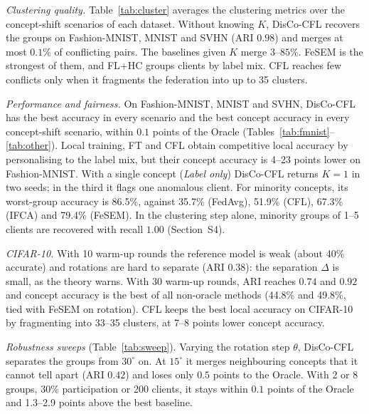 \documentclass[journal]{IEEEtran}
\theoremstyle{definition}
\begin{document}
\emph{Clustering quality.} Table~\ref{tab:cluster} averages the clustering metrics over the concept-shift scenarios of each dataset. Without knowing $K$, DisCo-CFL recovers the groups on Fashion-MNIST, MNIST and SVHN (ARI $0.98$) and merges at most $0.1\%$ of conflicting pairs. The baselines given $K$ merge $3$--$85\%$. FeSEM is the strongest of them, and FL+HC groups clients by label mix. CFL reaches few conflicts only when it fragments the federation into up to 35 clusters.

\begin{table}[t]
\centering
\caption{Clustering: mean ARI and conflict-merge rate (Conf., \%) over the concept-shift scenarios of each dataset.}\label{tab:cluster}
\scriptsize\setlength{\tabcolsep}{2.5pt}

\end{table}

\emph{Performance and fairness.} On Fashion-MNIST, MNIST and SVHN, DisCo-CFL has the best accuracy in every scenario and the best concept accuracy in every concept-shift scenario, within $0.1$ points of the Oracle (Tables~\ref{tab:fmnist}--\ref{tab:other}). Local training, FT and CFL obtain competitive local accuracy by personalising to the label mix, but their concept accuracy is 4--23 points lower on Fashion-MNIST. With a single concept (\emph{Label only}) DisCo-CFL returns $K=1$ in two seeds; in the third it flags one anomalous client. For minority concepts, its worst-group accuracy is 86.5\%, against 35.7\% (FedAvg), 51.9\% (CFL), 67.3\% (IFCA) and 79.4\% (FeSEM). In the clustering step alone, minority groups of 1--5 clients are recovered with recall $1.00$ (Section~S4).

\emph{CIFAR-10.} With 10 warm-up rounds the reference model is weak (about 40\% accurate) and rotations are hard to separate (ARI $0.38$): the separation $\Delta$ is small, as the theory warns. With 30 warm-up rounds, ARI reaches $0.74$ and $0.92$ and concept accuracy is the best of all non-oracle methods (44.8\% and 49.8\%, tied with FeSEM on rotation). CFL keeps the best local accuracy on CIFAR-10 by fragmenting into 33--35 clusters, at 7--8 points lower concept accuracy.

\emph{Robustness sweeps} (Table~\ref{tab:sweep}). Varying the rotation step $\theta$, DisCo-CFL separates the groups from $30^\circ$ on. At $15^\circ$ it merges neighbouring concepts that it cannot tell apart (ARI $0.42$) and loses only $0.5$ points to the Oracle. With 2 or 8 groups, 30\% participation or 200 clients, it stays within $0.1$ points of the Oracle and 1.3--2.9 points above the best baseline.
\end{document}
